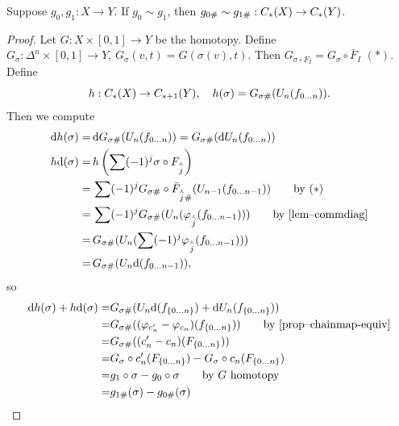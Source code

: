 \documentclass[a4paper,11pt]{article}
\begin{document}
			\begin{thm}
				Suppose $g_0,g_1:X\rightarrow Y$. If $g_0\sim g_1$, then $g_{0\#}\sim g_{1\#}:\cx{X}\rightarrow \cx{Y}$.
			\end{thm}
			\begin{proof}
				Let $G:X\times[0,1]\rightarrow Y$ be the homotopy. Define $G_\sigma:\Delta^n\times[0,1]\rightarrow Y,\, G_\sigma(v,t)=G(\sigma(v),t)$. Then $G_{\sigma\circ F_I}=G_\sigma\circ \bar{F}_I$ $(\ast)$. Define 
				\begin{equation*}
					h:\cx{X}\rightarrow \cx[\ast+1]{Y},\quad h(\sigma)=G_{\sigma\#}(U_n(f_{0\dots n})).
				\end{equation*}
				Then we compute
				\begin{align*}
					\mathrm{d}h(\sigma)=&\,\mathrm{d}G_{\sigma\#}(U_n(f_{0\dots n}))=G_{\sigma\#}(\mathrm{d}U_n(f_{0\dots n}))\\
					h\mathrm{d}(\sigma)=&\,h\left(\sum(-1)^j\sigma\circ F_{\overset{\curlywedge}{j}}\right)\\
					=&\,\sum(-1)^{j}G_{\sigma\#}\circ\bar{F}_{\overset{\curlywedge}{j}\#}(U_{n-1}(f_{0\dots n-1}))\qquad\text{by $(\ast)$}\\
					=&\,\sum(-1)^jG_{\sigma\#}(U_n(\varphi_{\overset{\curlywedge}{j}}(f_{0\dots n-1})))\qquad\text{by \autoref{lem--commdiag}}\\
					=&\,G_{\sigma\#}(U_n(\sum(-1)^j\varphi_{\overset{\curlywedge}{j}}(f_{0\dots n-1})))\\
					=&\,G_{\sigma\#}(U_n\mathrm{d}(f_{0\dots n-1})),
				\end{align*}
				so
				\begin{align*}
					\mathrm{d}h(\sigma)+h\mathrm{d}(\sigma)=&G_{\sigma\#}(U_n\mathrm{d}(f_{\{0\dots n\}})+\mathrm{d}U_n(f_{\{0\dots n\}}))\\
					=&G_{\sigma\#}((\varphi_{c^\prime_n}-\varphi_{c_n})(f_{\{0\dots n\}}))\qquad\text{by \autoref{prop--chainmap-equiv}}\\
					=&G_{\sigma\#}((c^\prime_n-c_n)(F_{\{0\dots n\}}))\\
					=&G_{\sigma}\circ c^\prime_n(F_{\{0\dots n\}})-G_{\sigma}\circ c_n(F_{\{0\dots n\}})\\
					=&g_1\circ\sigma-g_0\circ\sigma\qquad\text{by $G$ homotopy}\\
					=&g_{1\#}(\sigma)-g_{0\#}(\sigma)
				\end{align*}
			\end{proof}	
\end{document}
